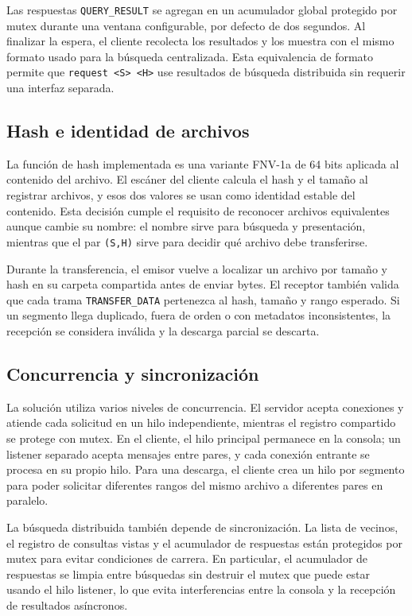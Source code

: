 \documentclass[12pt]{article}
\begin{document}
Las respuestas \texttt{QUERY\_RESULT} se agregan en un acumulador global
protegido por mutex durante una ventana configurable, por defecto de dos
segundos. Al finalizar la espera, el cliente recolecta los resultados y los
muestra con el mismo formato usado para la búsqueda centralizada. Esta
equivalencia de formato permite que \verb|request <S> <H>| use resultados de
búsqueda distribuida sin requerir una interfaz separada.

\subsection{Hash e identidad de archivos}

La función de hash implementada es una variante FNV-1a de 64 bits aplicada al
contenido del archivo. El escáner del cliente calcula el hash y el tamaño al
registrar archivos, y esos dos valores se usan como identidad estable del
contenido. Esta decisión cumple el requisito de reconocer archivos equivalentes
aunque cambie su nombre: el nombre sirve para búsqueda y presentación, mientras
que el par \texttt{(S,H)} sirve para decidir qué archivo debe transferirse.

Durante la transferencia, el emisor vuelve a localizar un archivo por tamaño y
hash en su carpeta compartida antes de enviar bytes. El receptor también valida
que cada trama \texttt{TRANSFER\_DATA} pertenezca al hash, tamaño y rango
esperado. Si un segmento llega duplicado, fuera de orden o con metadatos
inconsistentes, la recepción se considera inválida y la descarga parcial se
descarta.

\subsection{Concurrencia y sincronización}

La solución utiliza varios niveles de concurrencia. El servidor acepta
conexiones y atiende cada solicitud en un hilo independiente, mientras el
registro compartido se protege con mutex. En el cliente, el hilo principal
permanece en la consola; un listener separado acepta mensajes entre pares, y
cada conexión entrante se procesa en su propio hilo. Para una descarga, el
cliente crea un hilo por segmento para poder solicitar diferentes rangos del
mismo archivo a diferentes pares en paralelo.

La búsqueda distribuida también depende de sincronización. La lista de vecinos,
el registro de consultas vistas y el acumulador de respuestas están protegidos
por mutex para evitar condiciones de carrera. En particular, el acumulador de
respuestas se limpia entre búsquedas sin destruir el mutex que puede estar
usando el hilo listener, lo que evita interferencias entre la consola y la
recepción de resultados asíncronos.
\end{document}
